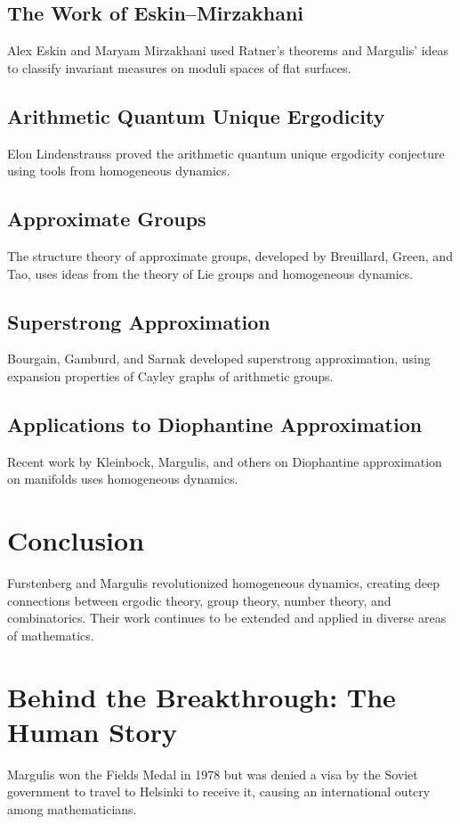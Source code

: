 \subsection{The Work of Eskin--Mirzakhani}

Alex Eskin and Maryam Mirzakhani used Ratner's theorems and Margulis' ideas to classify invariant measures on moduli spaces of flat surfaces.

\subsection{Arithmetic Quantum Unique Ergodicity}

Elon Lindenstrauss proved the arithmetic quantum unique ergodicity conjecture using tools from homogeneous dynamics.

\subsection{Approximate Groups}

The structure theory of approximate groups, developed by Breuillard, Green, and Tao, uses ideas from the theory of Lie groups and homogeneous dynamics.

\subsection{Superstrong Approximation}

Bourgain, Gamburd, and Sarnak developed superstrong approximation, using expansion properties of Cayley graphs of arithmetic groups.

\subsection{Applications to Diophantine Approximation}

Recent work by Kleinbock, Margulis, and others on Diophantine approximation on manifolds uses homogeneous dynamics.

\section{Conclusion}

Furstenberg and Margulis revolutionized homogeneous dynamics, creating deep connections between ergodic theory, group theory, number theory, and combinatorics. Their work continues to be extended and applied in diverse areas of mathematics.


\section{Behind the Breakthrough: The Human Story}
Margulis won the Fields Medal in 1978 but was denied a visa by the Soviet government to travel to Helsinki to receive it, causing an international outcry among mathematicians.


